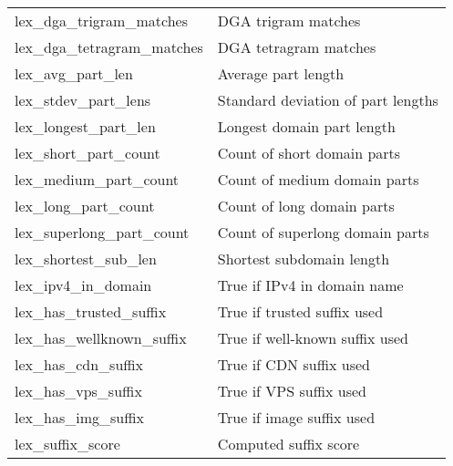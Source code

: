 \begin{longtable}{@{}ll@{}}
lex\_dga\_trigram\_matches & DGA trigram matches \\
lex\_dga\_tetragram\_matches & DGA tetragram matches \\
lex\_avg\_part\_len & Average part length \\
lex\_stdev\_part\_lens & Standard deviation of part lengths \\
lex\_longest\_part\_len & Longest domain part length \\
lex\_short\_part\_count & Count of short domain parts \\
lex\_medium\_part\_count & Count of medium domain parts \\
lex\_long\_part\_count & Count of long domain parts \\
lex\_superlong\_part\_count & Count of superlong domain parts \\
lex\_shortest\_sub\_len & Shortest subdomain length \\
lex\_ipv4\_in\_domain & True if IPv4 in domain name \\
lex\_has\_trusted\_suffix & True if trusted suffix used \\
lex\_has\_wellknown\_suffix & True if well-known suffix used \\
lex\_has\_cdn\_suffix & True if CDN suffix used \\
lex\_has\_vps\_suffix & True if VPS suffix used \\
lex\_has\_img\_suffix & True if image suffix used \\
lex\_suffix\_score & Computed suffix score \\


\end{longtable}
